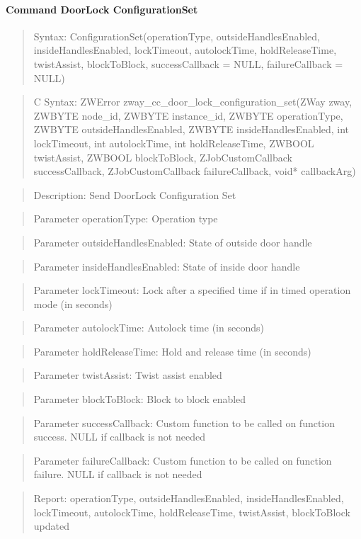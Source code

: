 \paragraph{Command DoorLock ConfigurationSet}
\begin{quote}Syntax: ConfigurationSet(operationType, outsideHandlesEnabled, insideHandlesEnabled, lockTimeout, autolockTime, holdReleaseTime, twistAssist, blockToBlock, successCallback = NULL, failureCallback = NULL)\end{quote}
\begin{quote}C Syntax: ZWError zway\_cc\_door\_lock\_configuration\_set(ZWay zway, ZWBYTE node\_id, ZWBYTE instance\_id, ZWBYTE operationType, ZWBYTE outsideHandlesEnabled, ZWBYTE insideHandlesEnabled, int lockTimeout, int autolockTime, int holdReleaseTime, ZWBOOL twistAssist, ZWBOOL blockToBlock, ZJobCustomCallback successCallback, ZJobCustomCallback failureCallback, void* callbackArg)\end{quote}
\begin{quote}Description: Send DoorLock Configuration Set\end{quote}
\begin{quote}Parameter operationType: Operation type\end{quote}
\begin{quote}Parameter outsideHandlesEnabled: State of outside door handle\end{quote}
\begin{quote}Parameter insideHandlesEnabled: State of inside door handle\end{quote}
\begin{quote}Parameter lockTimeout: Lock after a specified time if in timed operation mode (in seconds)\end{quote}
\begin{quote}Parameter autolockTime: Autolock time (in seconds)\end{quote}
\begin{quote}Parameter holdReleaseTime: Hold and release time (in seconds)\end{quote}
\begin{quote}Parameter twistAssist: Twist assist enabled\end{quote}
\begin{quote}Parameter blockToBlock: Block to block enabled\end{quote}
\begin{quote}Parameter successCallback: Custom function to be called on function success. NULL if callback is not needed\end{quote}
\begin{quote}Parameter failureCallback: Custom function to be called on function failure. NULL if callback is not needed\end{quote}
\begin{quote}Report: operationType, outsideHandlesEnabled, insideHandlesEnabled, lockTimeout, autolockTime, holdReleaseTime, twistAssist, blockToBlock updated\end{quote}


